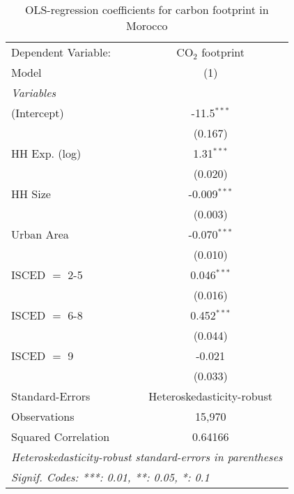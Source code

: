 
\begin{table}[htbp!]
   \centering
   \small
   \begin{adjustbox}{width = 1\textwidth, max height = 0.95\textheight, center}
      \begin{threeparttable}[b]
         \caption{\label{tab:OLS_2_MAR} OLS-regression coefficients for carbon footprint in Morocco}
         \begin{tabular}{lc}
            \tabularnewline \midrule \midrule
            Dependent Variable: & CO$_{2}$ footprint\\  
            Model               & (1)\\  
            \midrule
            \emph{Variables}\\
            (Intercept)         & -11.5$^{***}$\\   
                                & (0.167)\\   
            HH Exp. (log)       & 1.31$^{***}$\\   
                                & (0.020)\\   
            HH Size             & -0.009$^{***}$\\   
                                & (0.003)\\   
            Urban Area          & -0.070$^{***}$\\   
                                & (0.010)\\   
            ISCED $=$ 2-5       & 0.046$^{***}$\\   
                                & (0.016)\\   
            ISCED $=$ 6-8       & 0.452$^{***}$\\   
                                & (0.044)\\   
            ISCED $=$ 9         & -0.021\\   
                                & (0.033)\\   
            \midrule 
            Standard-Errors     & Heteroskedasticity-robust \\   
            Observations        & 15,970\\  
            Squared Correlation & 0.64166\\  
            \midrule \midrule
            \multicolumn{2}{l}{\emph{Heteroskedasticity-robust standard-errors in parentheses}}\\
            \multicolumn{2}{l}{\emph{Signif. Codes: ***: 0.01, **: 0.05, *: 0.1}}\\
         \end{tabular}
         

\end{threeparttable}
\end{adjustbox}
\end{table}
